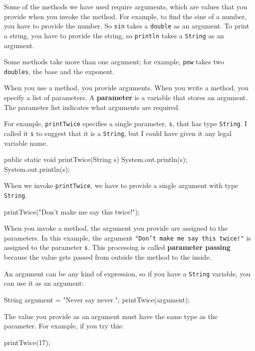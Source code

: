 
Some of the methods we have used require arguments, which are values that you provide when you invoke the method.
For example, to find the sine of a number, you have to provide the number.
So {\tt sin} takes a {\tt double} as an argument.
To print a string, you have to provide the string, so {\tt println} takes a {\tt String} as an argument.

Some methods take more than one argument; for example, {\tt pow} takes two {\tt doubles}, the base and the exponent.

When you use a method, you provide arguments.
When you write a method, you specify a list of parameters.
A {\bf parameter} is a variable that stores an argument.
The parameter list indicates what arguments are required.

For example, {\tt printTwice} specifies a single parameter, {\tt s}, that has type {\tt String}.
I called it {\tt s} to suggest that it is a {\tt String}, but I could have given it any legal variable name.

\begin{code}
    public static void printTwice(String s) {
        System.out.println(s);
        System.out.println(s);
    }
\end{code}

When we invoke {\tt printTwice}, we have to provide a single argument with type {\tt String}.

\begin{code}
    printTwice("Don't make me say this twice!");
\end{code}

When you invoke a method, the argument you provide are assigned to the parameters.
In this example, the argument {\tt "Don't make me say this twice!"} is assigned to the parameter {\tt s}.
This processing is called {\bf parameter passing} because the value gets passed from outside the method to the inside.

An argument can be any kind of expression, so if you have a {\tt String} variable, you can use it as an argument:

\begin{code}
    String argument = "Never say never.";
    printTwice(argument);
\end{code}

The value you provide as an argument must have the same type as the parameter.
For example, if you try this:

\begin{code}
    printTwice(17);
\end{code}

